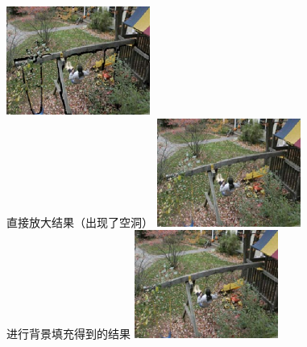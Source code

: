 \documentclass[xcolor=svgnames,serif,table]{beamer}
\begin{document}
\begin{frame}
  \begin{columns}
    \tiny
    \centering
    \includegraphics[width=\textwidth]{lag4.png}\\
    直接放大结果（出现了空洞）
    \centering
    \includegraphics[width=\textwidth]{lag5.png}\\
    进行背景填充得到的结果
    \centering
    \includegraphics[width=\textwidth]{lag6.png}\\

\end{columns}
\end{frame}
\end{document}
